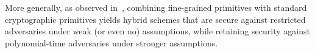 More generally, as observed in~\cite{C:DegVaiVas16}, combining fine-grained primitives with standard cryptographic primitives yields hybrid schemes that are secure against restricted adversaries under weak (or even no) assumptions, while retaining security against polynomial-time adversaries under stronger assumptions.


%

